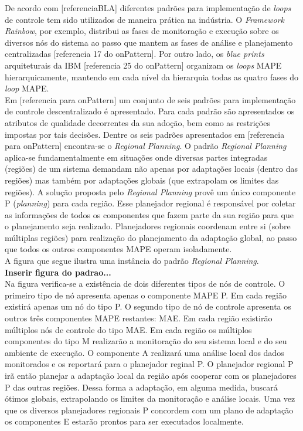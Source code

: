 \documentclass[conference]{IEEEtran}
\begin{document}
De acordo com [referenciaBLA] diferentes padrões para implementação de \textit{loops} de controle tem sido utilizados de maneira prática na indústria. O \textit{Framework Rainbow}, por exemplo, distribui as fases de monitoração e execução sobre os diversos nós do sistema ao passo que mantem as fases de análise e planejamento centralizadas [referencia 17 do onPattern]. Por outro lado, os \textit{blue prints} arquiteturais da IBM [referencia 25 do onPattern] organizam os \textit{loops} MAPE hierarquicamente, mantendo em cada nível da hierarquia todas as quatro fases do \textit{loop} MAPE.\\
Em [referencia para onPattern] um conjunto de seis padrões para implementação de controle descentralizado é apresentado. Para cada padrão são apresentados os atributos de qualidade decorrentes da sua adoção, bem como as restrições impostas por tais decisões. Dentre os seis padrões apresentados em [referencia para onPattern] encontra-se o \textit{Regional Planning}. O padrão \textit{Regional Planning} aplica-se fundamentalmente em situações onde diversas partes integradas (regiões) de um sistema demandam não apenas por adaptações locais (dentro das regiões) mas também por adaptações globais (que extrapolam os limites das regiões). A solução proposta pelo \textit{Regional Planning} provê um único componente P (\textit{planning}) para cada região. Esse planejador regional é responsável por coletar as informações de todos os componentes que fazem parte da sua região para que o planejamento seja realizado. Planejadores regionais coordenam entre si (sobre múltiplas regiões) para realização do planejamento da adaptação global, ao passo que todos os outros componentes MAPE operam isoladamente.\\
A figura que segue ilustra uma instância do padrão \textit{Regional Planning}.\\
\textbf{Inserir figura do padrao...}\\
Na figura verifica-se a existência de dois diferentes tipos de nós de controle. O primeiro tipo de nó apresenta apenas o componente MAPE P. Em cada região existirá apenas um nó do tipo P. O segundo tipo de nó de controle apresenta os outros três componentes MAPE restantes: MAE. Em cada região existirão múltiplos nós de controle do tipo MAE. Em cada região os múltiplos componentes do tipo M  realizarão a monitoração do seu sistema local e do seu ambiente de execução. O componente A realizará uma análise local dos dados monitorados e os reportará para o planejador reginal P. O planejador regional P irã então planejar a adaptação local da região após cooperar com os planejadores P das outras regiões. Dessa forma a adaptação, em alguma medida, buscará ótimos globais, extrapolando os limites da monitoração e análise locais. Uma vez que os diversos planejadores regionais P concordem com um plano de adaptação os componentes E estarão prontos para ser executados localmente.\\
\end{document}
